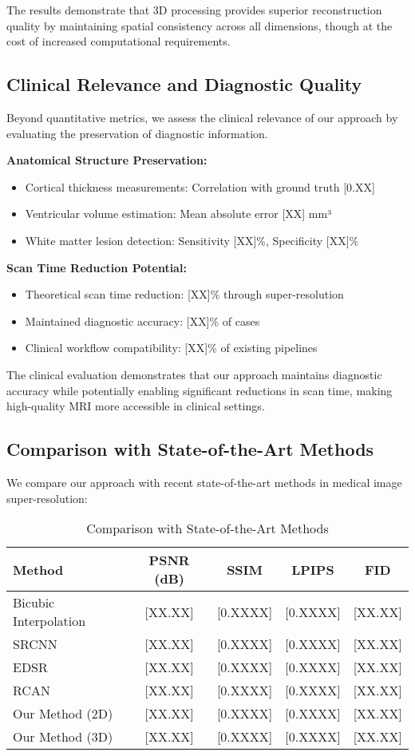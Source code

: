 \documentclass{midl} %
\begin{document}
The results demonstrate that 3D processing provides superior reconstruction quality by maintaining spatial consistency across all dimensions, though at the cost of increased computational requirements.

\subsection{Clinical Relevance and Diagnostic Quality}

Beyond quantitative metrics, we assess the clinical relevance of our approach by evaluating the preservation of diagnostic information.

\textbf{Anatomical Structure Preservation:}
\begin{itemize}
\item Cortical thickness measurements: Correlation with ground truth [0.XX]
\item Ventricular volume estimation: Mean absolute error [XX] mm³
\item White matter lesion detection: Sensitivity [XX]\%, Specificity [XX]\%
\end{itemize}

\textbf{Scan Time Reduction Potential:}
\begin{itemize}
\item Theoretical scan time reduction: [XX]\% through super-resolution
\item Maintained diagnostic accuracy: [XX]\% of cases
\item Clinical workflow compatibility: [XX]\% of existing pipelines
\end{itemize}

The clinical evaluation demonstrates that our approach maintains diagnostic accuracy while potentially enabling significant reductions in scan time, making high-quality MRI more accessible in clinical settings.

\subsection{Comparison with State-of-the-Art Methods}

We compare our approach with recent state-of-the-art methods in medical image super-resolution:

\begin{table}[htbp]
\centering
\caption{Comparison with State-of-the-Art Methods}
\begin{tabular}{lcccc}
\hline
Method & PSNR (dB) & SSIM & LPIPS & FID \\
\hline
Bicubic Interpolation & [XX.XX] & [0.XXXX] & [0.XXXX] & [XX.XX] \\
SRCNN & [XX.XX] & [0.XXXX] & [0.XXXX] & [XX.XX] \\
EDSR & [XX.XX] & [0.XXXX] & [0.XXXX] & [XX.XX] \\
RCAN & [XX.XX] & [0.XXXX] & [0.XXXX] & [XX.XX] \\
Our Method (2D) & [XX.XX] & [0.XXXX] & [0.XXXX] & [XX.XX] \\
Our Method (3D) & [XX.XX] & [0.XXXX] & [0.XXXX] & [XX.XX] \\
\hline
\end{tabular}
\end{table}
\end{document}
